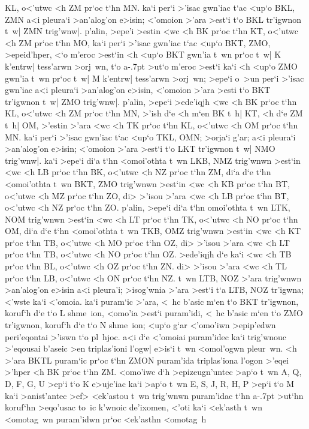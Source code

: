 \begin{Parallel}{}{}
{{KL, o<'utwc <h ZM pr`oc t`hn MN. ka`i per`i >'isac gwn'iac t`ac
<up`o BKL, ZMN a<i pleura`i >an'alog'on e>isin; <'omoion
>'ara >est`i t`o BKL tr'igwnon t~w| ZMN trig'wnw|. 
p'alin, >epe'i >estin <wc <h BK
pr`oc t`hn KT, o<'utwc <h ZM pr`oc t`hn MO, ka`i per`i >'isac gwn'iac t`ac <up`o
BKT, ZMO, >epeid'hper, <`o m'eroc >est`in <h <up`o BKT gwn'ia t~wn pr`oc
t~w| K k'entrw| tess'arwn >orj~wn, t`o a\kern -.7pt >ut`o m'eroc >est`i ka`i <h <up`o ZMO
gwn'ia t~wn pr`oc t~w| M k'entrw| tess'arwn >orj~wn; >epe`i o~>un per`i
>'isac gwn'iac a<i pleura`i >an'alog'on e>isin, <'omoion >'ara >esti t`o  BKT tr'igwnon
t~w| ZMO trig'wnw|. p'alin, >epe`i >ede'iqjh <wc <h BK pr`oc t`hn KL,
o<'utwc <h ZM pr`oc t`hn MN, >'ish d`e <h m`en BK t~h| KT, <h d`e ZM t~h|
OM, >'estin >'ara <wc <h TK pr`oc t`hn KL, o<'utwc <h OM pr`oc t`hn MN. ka`i
per`i >'isac gwn'iac t`ac <up`o TKL, OMN; >orja`i g'ar; a<i pleura`i >an'alog'on
e>isin; <'omoion >'ara >est`i t`o LKT tr'igwnon t~w| NMO trig'wnw|. ka`i
>epe`i di`a t`hn <omoi'othta t~wn LKB, NMZ trig'wnwn >est`in <wc <h LB
pr`oc t`hn BK, o<'utwc <h NZ pr`oc t`hn ZM, di`a d`e t`hn <omoi'othta t~wn 
BKT,
ZMO trig'wnwn >est`in <wc <h KB pr`oc t`hn BT, o<'utwc <h MZ pr`oc t`hn ZO,
di> >'isou >'ara <wc <h LB pr`oc t`hn BT, o<'utwc <h NZ pr`oc t`hn ZO. p'alin,
>epe`i di`a t`hn omoi'othta t~wn LTK, NOM trig'wnwn >est`in <wc <h LT pr`oc
t`hn TK, o<'utwc <h NO pr`oc t`hn OM, di`a d`e t`hn <omoi'othta t~wn TKB, OMZ
trig'wnwn >est`in <wc <h KT pr`oc t`hn TB, o<'utwc <h MO pr`oc t`hn OZ, di>
>'isou >'ara <wc <h LT pr`oc t`hn TB, o<'utwc <h NO pr`oc t`hn OZ. >ede'iqjh
d`e ka`i <wc <h TB pr`oc t`hn BL, o<'utwc <h OZ pr`oc t`hn ZN. di> >'isou
>'ara <wc <h TL pr`oc t`hn LB, o<'utwc <h ON pr`oc t`hn NZ. t~wn LTB, NOZ
>'ara trig'wnwn >an'alog'on e>isin a<i pleura'i; >isog'wnia >'ara >est`i t`a LTB, NOZ
tr'igwna; <'wste ka`i <'omoia. ka`i puram`ic >'ara, <~hc b'asic m`en t`o BKT tr'igwnon,
koruf`h d`e t`o L shme~ion, <omo'ia >est`i puram'idi, <~hc b'asic m`en t`o ZMO
tr'igwnon, koruf`h d`e t`o N shme~ion; <up`o g`ar <'omo'iwn >epip'edwn peri'eqontai
>'iswn t`o pl~hjoc. a<i d`e <'omoiai puram'idec ka`i trig'wnouc >'eqousai b'aseic
>en triplas'ioni l'ogw| e>is`i t~wn <omol'ogwn pleur~wn. <h >'ara BKTL puram`ic
pr`oc t`hn ZMON puram'ida triplas'iona l'ogon >'eqei >'hper <h BK pr`oc 
t`hn ZM.
<omo'iwc d`h >epizeugn'untec >ap`o t~wn A, Q, D, F, G, U >ep`i t`o K e>uje'iac
ka`i >ap`o  t~wn E, S, J, R, H, P >ep`i t`o M ka`i >anist'antec >ef> <ek'astou
t~wn trig'wnwn puram'idac t`hn a\kern -.7pt >ut`hn koruf`hn >eqo'usac to~ic k'wnoic
de'ixomen, <'oti ka`i <ek'asth t~wn <omotag~wn puram'idwn pr`oc <ek'asthn <omotag~h
}}
\end{Parallel}
